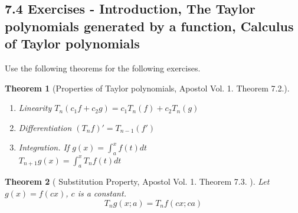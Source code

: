 \documentclass[twoside]{amsart}
\theoremstyle{plain}
\newtheorem{theorem}{Theorem}
\theoremstyle{definition}
\newcommand{\exercisehead}[1]
  {\smallskip
   \noindent{\small\bf Exercise #1.}}
\begin{document}








\subsection*{ 7.4 Exercises - Introduction, The Taylor polynomials generated by a function, Calculus of Taylor polynomials }

Use the following theorems for the following exercises.  
\begin{theorem}[Properties of Taylor polynomials, Apostol Vol. 1. Theorem 7.2.]
  \begin{enumerate}
    \item Linearity $T_n(c_1 f + c_2 g) = c_1 T_n(f) + c_2 T_n(g)$ 
    \item Differentiation $(T_n f)' = T_{n-1}(f') $ 
    \item Integration.  If $g(x) = \int_a^x f(t)dt$ \\
      $ T_{n+1} g(x) = \int_a^x T_n f(t) dt $
  \end{enumerate}
\end{theorem}

\begin{theorem}[ Substitution Property, Apostol Vol. 1. Theorem 7.3. ] Let $g(x) = f(cx)$, $c$ is a constant.  
  \begin{equation}
    T_n g(x; a) = T_n f(cx; ca) 
  \end{equation}
\end{theorem}
\end{document}
